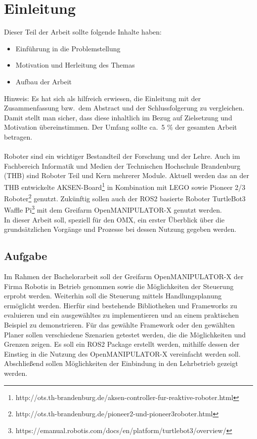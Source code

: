 \section{Einleitung} \label{einleitung}
Dieser Teil der Arbeit sollte folgende Inhalte haben:

\begin{itemize}
\item Einführung in die Problemstellung
\item Motivation und Herleitung des Themas
\item Aufbau der Arbeit
\end{itemize}

Hinweis:
Es hat sich als hilfreich erwiesen, die Einleitung mit der Zusammenfassung bzw.\ dem Abstract und der Schlussfolgerung zu vergleichen.
Damit stellt man sicher, dass diese inhaltlich im Bezug auf Zielsetzung und Motivation übereinstimmen.
Der Umfang sollte ca.\ 5 \% der gesamten Arbeit betragen.
\\
\\
Roboter sind ein wichtiger Bestandteil der Forschung und der Lehre.
Auch im Fachbereich Informatik und Medien der Technischen Hochschule Brandenburg (THB) sind Roboter Teil und Kern mehrerer Module.
Aktuell werden das an der THB entwickelte AKSEN-Board\footnote{http://ots.th-brandenburg.de/aksen-controller-fur-reaktive-roboter.html} in Kombination mit LEGO sowie Pioneer 2/3 Roboter\footnote{http://ots.th-brandenburg.de/pioneer2-und-pioneer3roboter.html} genutzt.
Zukünftig sollen auch der \acs{ROS2} basierte Roboter TurtleBot3 Waffle Pi\footnote{https://emanual.robotis.com/docs/en/platform/turtlebot3/overview/} mit dem Greifarm OpenMANIPULATOR-X genutzt werden.\\
In dieser Arbeit soll, speziell für den OMX, ein erster Überblick über die grundsätzlichen Vorgänge und Prozesse bei dessen Nutzung gegeben werden.

\subsection{Aufgabe}
Im Rahmen der Bachelorarbeit soll der Greifarm OpenMANIPULATOR-X der Firma Robotis in Betrieb genommen sowie die Möglichkeiten der Steuerung erprobt werden.
Weiterhin soll die Steuerung mittels Handlungsplanung ermöglicht werden.
Hierfür sind bestehende Bibliotheken und Frameworks zu evaluieren und ein ausgewähltes zu implementieren und an einem praktischen Beispiel zu demonstrieren.
Für das gewählte Framework oder den gewählten Planer sollen verschiedene Szenarien getestet werden, die die Möglichkeiten und Grenzen zeigen.
Es soll ein ROS2 Package erstellt werden, mithilfe dessen der Einstieg in die Nutzung des OpenMANIPULATOR-X vereinfacht werden soll.
Abschließend sollen Möglichkeiten der Einbindung in den Lehrbetrieb gezeigt werden.

